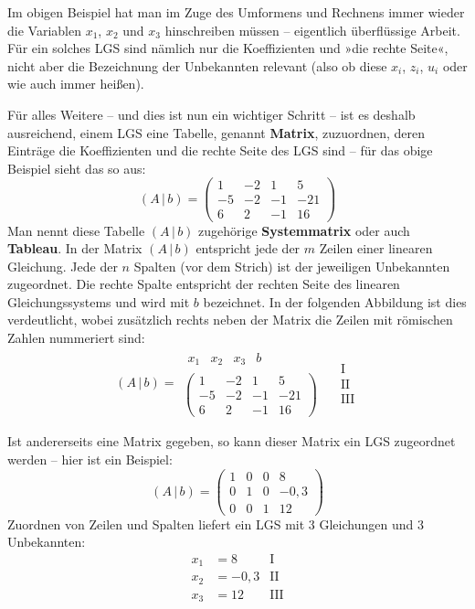 Im obigen Beispiel hat man im Zuge des Umformens und Rechnens immer wieder die Variablen $x_1$, $x_2$ und $x_3$ hinschreiben müssen -- eigentlich überflüssige Arbeit. Für ein solches LGS sind nämlich nur die Koeffizienten und »die rechte Seite«, nicht aber die Bezeichnung der Unbekannten relevant (also ob diese $x_i$, $z_i$, $u_i$ oder wie auch immer heißen).

Für alles Weitere -- und dies ist nun ein wichtiger Schritt -- ist es deshalb ausreichend, einem LGS eine Tabelle, genannt \textbf{Matrix}, zuzuordnen, deren Einträge die Koeffizienten und die rechte Seite des LGS sind -- für das obige Beispiel sieht das so aus:
\[ (A\,|\,b) = \left(\begin{array}{ccc|c} 1 & -2 & 1 & 5\\ -5 & -2 & -1 & -21\\ 6 & 2 & -1 & 16 \end{array}\right) \]
Man nennt diese Tabelle $(A\,|\,b)$ zugehörige \textbf{Systemmatrix} oder auch \textbf{Tableau}. In der Matrix $(A\,|\,b)$ entspricht jede der $m$ Zeilen einer linearen Gleichung. Jede der $n$ Spalten (vor dem Strich) ist der jeweiligen Unbekannten zugeordnet. Die rechte Spalte entspricht der rechten Seite des linearen Gleichungssystems und wird mit $b$ bezeichnet. In der folgenden Abbildung ist dies verdeutlicht, wobei zusätzlich rechts neben der Matrix die Zeilen mit römischen Zahlen nummeriert sind:
\[ (A\,|\,b) = \begin{array}{c} \begin{array}{ccc|c} x_1 & x_2 & x_3 & b \end{array} \\ \left(\begin{array}{ccc|c} 1 & -2 & 1 & 5\\ -5 & -2 & -1 & -21\\ 6 & 2 & -1 & 16 \end{array}\right) \end{array} \quad \begin{array}{l} \text{I}\\ \text{II}\\ \text{III} \end{array} \]

Ist andererseits eine Matrix gegeben, so kann dieser Matrix ein LGS zugeordnet werden -- hier ist ein Beispiel:
\[ (A\,|\,b) = \left(\begin{array}{ccc|c} 1 & 0 & 0 & 8\\ 0 & 1 & 0 & -0{,}3\\ 0 & 0 & 1 & 12 \end{array}\right) \]
Zuordnen von Zeilen und Spalten liefert ein LGS mit 3 Gleichungen und 3 Unbekannten:
\[ \begin{array}{ccl} x_1 &= 8 & \text{I}\\ x_2 &= -0{,}3 & \text{II}\\ x_3 &= 12 & \text{III} \end{array} \]

